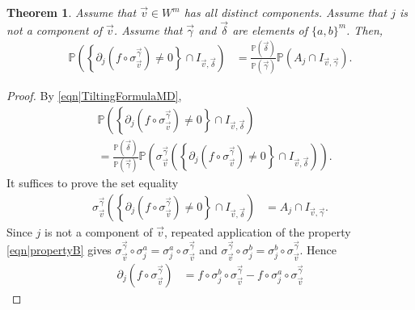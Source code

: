 \documentclass[reqno]{amsart}
\newtheorem{theorem}{Theorem}
\begin{document}
\begin{theorem}\label{thm|multipleFlips}
Assume that $\overrightarrow v\in W^m$ has all distinct components. Assume that $j$ is not a component of $\overrightarrow v$. Assume that $\overrightarrow \gamma$ and $\overrightarrow \delta$ are elements of $\{a,b\}^m$. Then, 
\begin{align}
\mathbb P\left(\left\{\partial_j \left(f\circ \sigma_{\overrightarrow v}^{\overrightarrow\gamma}\right)\neq0\right\} \cap I_{\overrightarrow v,\overrightarrow\delta}\right)
&= 
\frac{\mathbb P(\overrightarrow\delta)}{\mathbb P(\overrightarrow\gamma)} \mathbb P(A_j\cap I_{\overrightarrow v,\overrightarrow\gamma}).
\label{eqn|multipleFlips}
\end{align}
\end{theorem}
\begin{proof} 
By \eqref{eqn|TiltingFormulaMD},
\begin{align*}
&\mathbb P\left(\left\{\partial_j \left(f\circ \sigma_{\overrightarrow v}^{\overrightarrow\gamma}\right)\neq0\right\} \cap I_{\overrightarrow v,\overrightarrow\delta}\right)
\\ &=
\frac{\mathbb P(\overrightarrow\delta)}{\mathbb P(\overrightarrow\gamma)}\mathbb P\left(\sigma_{\overrightarrow v}^{\overrightarrow \gamma}\left(\left\{\partial_j \left(f\circ \sigma_{\overrightarrow v}^{\overrightarrow\gamma}\right)\neq0\right\} \cap I_{\overrightarrow v,\overrightarrow\delta}
\right)
\right).
\end{align*}
It suffices to prove the set equality
\begin{align}
\sigma_{\overrightarrow v}^{\overrightarrow \gamma}\left(\left\{\partial_j \left(f\circ \sigma_{\overrightarrow v}^{\overrightarrow\gamma}\right)\neq0\right\} \cap I_{\overrightarrow v,\overrightarrow\delta}
\right)
&= 
A_j\cap I_{\overrightarrow v,\overrightarrow\gamma}. \label{eqn|multileFlips01}
\end{align}
Since $j$ is not a component of $\overrightarrow v$, repeated application of the property \eqref{eqn|propertyB} gives 
$\sigma_{\overrightarrow v}^{\overrightarrow \gamma}\circ \sigma_j^a=\sigma_j^a\circ \sigma_{\overrightarrow v}^{\overrightarrow \gamma}$ and 
$\sigma_{\overrightarrow v}^{\overrightarrow \gamma}\circ \sigma_j^b=\sigma_j^b\circ \sigma_{\overrightarrow v}^{\overrightarrow \gamma}$. Hence
\begin{align*}
\partial_j 
\left(f\circ \sigma_{\overrightarrow v}^{\overrightarrow\gamma}\right)
&=
f\circ\sigma_j^b\circ\sigma_{\overrightarrow v}^{\overrightarrow\gamma}-f\circ\sigma_j^a\circ\sigma_{\overrightarrow v}^{\overrightarrow\gamma}

\end{align*}
\end{proof}
\end{document}
